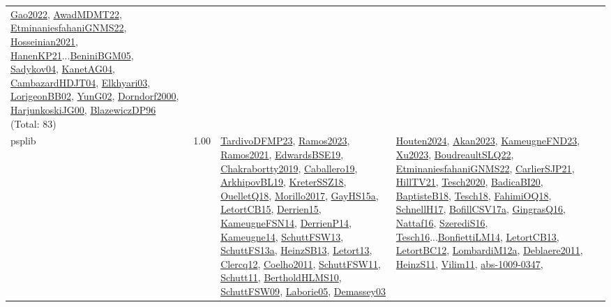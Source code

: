 {\begin{longtable}{p{3cm}r>{\raggedright\arraybackslash}p{6cm}>{\raggedright\arraybackslash}p{6cm}>{\raggedright\arraybackslash}p{8cm}}
\hyperref[detail:Gao2022]{Gao2022}, \hyperref[detail:AwadMDMT22]{AwadMDMT22}, \hyperref[detail:EtminaniesfahaniGNMS22]{EtminaniesfahaniGNMS22}, \hyperref[detail:Hosseinian2021]{Hosseinian2021}, \hyperref[detail:HanenKP21]{HanenKP21}...\hyperref[detail:BeniniBGM05]{BeniniBGM05}, \hyperref[detail:Sadykov04]{Sadykov04}, \hyperref[detail:KanetAG04]{KanetAG04}, \hyperref[detail:CambazardHDJT04]{CambazardHDJT04}, \hyperref[detail:Elkhyari03]{Elkhyari03}, \hyperref[detail:LorigeonBB02]{LorigeonBB02}, \hyperref[detail:YunG02]{YunG02}, \hyperref[detail:Dorndorf2000]{Dorndorf2000}, \hyperref[detail:HarjunkoskiJG00]{HarjunkoskiJG00}, \hyperref[detail:BlazewiczDP96]{BlazewiczDP96} (Total: 83)\\
\index{psplib}\index{Classification!psplib}psplib &  1.00 & \hyperref[detail:TardivoDFMP23]{TardivoDFMP23}, \hyperref[detail:Ramos2023]{Ramos2023}, \hyperref[detail:Ramos2021]{Ramos2021}, \hyperref[detail:EdwardsBSE19]{EdwardsBSE19}, \hyperref[detail:Chakrabortty2019]{Chakrabortty2019}, \hyperref[detail:Caballero19]{Caballero19}, \hyperref[detail:ArkhipovBL19]{ArkhipovBL19}, \hyperref[detail:KreterSSZ18]{KreterSSZ18}, \hyperref[detail:OuelletQ18]{OuelletQ18}, \hyperref[detail:Morillo2017]{Morillo2017}, \hyperref[detail:GayHS15a]{GayHS15a}, \hyperref[detail:LetortCB15]{LetortCB15}, \hyperref[detail:Derrien15]{Derrien15}, \hyperref[detail:KameugneFSN14]{KameugneFSN14}, \hyperref[detail:DerrienP14]{DerrienP14}, \hyperref[detail:Kameugne14]{Kameugne14}, \hyperref[detail:SchuttFSW13]{SchuttFSW13}, \hyperref[detail:SchuttFS13a]{SchuttFS13a}, \hyperref[detail:HeinzSB13]{HeinzSB13}, \hyperref[detail:Letort13]{Letort13}, \hyperref[detail:Clercq12]{Clercq12}, \hyperref[detail:Coelho2011]{Coelho2011}, \hyperref[detail:SchuttFSW11]{SchuttFSW11}, \hyperref[detail:Schutt11]{Schutt11}, \hyperref[detail:BertholdHLMS10]{BertholdHLMS10}, \hyperref[detail:SchuttFSW09]{SchuttFSW09}, \hyperref[detail:Laborie05]{Laborie05}, \hyperref[detail:Demassey03]{Demassey03} & \hyperref[detail:Houten2024]{Houten2024}, \hyperref[detail:Akan2023]{Akan2023}, \hyperref[detail:KameugneFND23]{KameugneFND23}, \hyperref[detail:Xu2023]{Xu2023}, \hyperref[detail:BoudreaultSLQ22]{BoudreaultSLQ22}, \hyperref[detail:EtminaniesfahaniGNMS22]{EtminaniesfahaniGNMS22}, \hyperref[detail:CarlierSJP21]{CarlierSJP21}, \hyperref[detail:HillTV21]{HillTV21}, \hyperref[detail:Tesch2020]{Tesch2020}, \hyperref[detail:BadicaBI20]{BadicaBI20}, \hyperref[detail:BaptisteB18]{BaptisteB18}, \hyperref[detail:Tesch18]{Tesch18}, \hyperref[detail:FahimiOQ18]{FahimiOQ18}, \hyperref[detail:SchnellH17]{SchnellH17}, \hyperref[detail:BofillCSV17a]{BofillCSV17a}, \hyperref[detail:GingrasQ16]{GingrasQ16}, \hyperref[detail:Nattaf16]{Nattaf16}, \hyperref[detail:SzerediS16]{SzerediS16}, \hyperref[detail:Tesch16]{Tesch16}...\hyperref[detail:BonfiettiLM14]{BonfiettiLM14}, \hyperref[detail:LetortCB13]{LetortCB13}, \hyperref[detail:LetortBC12]{LetortBC12}, \hyperref[detail:LombardiM12a]{LombardiM12a}, \hyperref[detail:Deblaere2011]{Deblaere2011}, \hyperref[detail:HeinzS11]{HeinzS11}, \hyperref[detail:Vilim11]{Vilim11}, \hyperref[detail:abs-1009-0347]{abs-1009-0347}, 
\end{longtable}}
